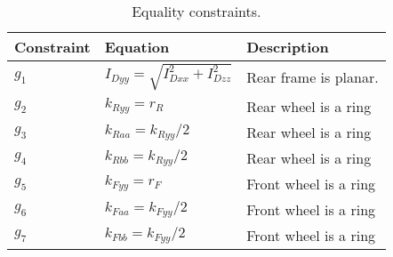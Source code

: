 \documentclass{bmd2019a}
\begin{document}
%
\begin{table}
  \caption{Equality constraints.}
  \label{tab:equality-constraints}
  \centering
  \begin{tabular}{lll}
    \toprule
    Constraint & Equation & Description \\
    \midrule
    $g_1$ & $I_{Dyy} = \sqrt{I_{Dxx}^2 + I_{Dzz}^2}$ & Rear frame is planar. \\
    $g_2$ & $k_{Ryy} = r_R$  & Rear wheel is a ring \\
    $g_3$ & $k_{Raa} = k_{Ryy}/2$ & Rear wheel is a ring \\
    $g_4$ & $k_{Rbb} = k_{Ryy}/2$ & Rear wheel is a ring \\
    $g_5$ & $k_{Fyy} = r_F$  & Front wheel is a ring \\
    $g_6$ & $k_{Faa} = k_{Fyy}/2$ & Front wheel is a ring \\
    $g_7$ & $k_{Fbb} = k_{Fyy}/2$ & Front wheel is a ring \\
    \bottomrule
  \end{tabular}
\end{table}
%
\end{document}
